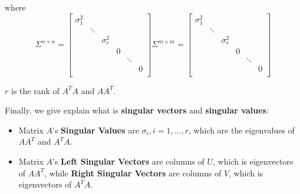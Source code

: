 \documentclass[a4paper]{book}
\newenvironment{proof}[1][Proof]{\begin{trivlist}
\item[\hskip \labelsep {\bfseries #1}]}{\end{trivlist}}
\begin{document}
\begin{proof}
        where
        \begin{displaymath}
          \Sigma^{n \times n}
          = 
          \begin{bmatrix}
            \sigma_{1}^{2}  &         & \\
                            & \ddots  & \\
                            &         & \sigma_{r}^{2} &    \\
                                &         &            & 0  &\\
                                &         &            &    & \ddots  & \\
                                &         &            &    &         &  0 \\
          \end{bmatrix}
          \Sigma^{m \times m}
          = 
          \begin{bmatrix}
            \sigma_{1}^{2}  &         & \\
                            & \ddots  & \\
                            &         & \sigma_{r}^{2} &    \\
                                &         &            & 0  &\\
                                &         &            &    & \ddots  & \\
                                &         &            &    &         &  0 \\
          \end{bmatrix}
        \end{displaymath}

        $r$ is the rank of $A^{T}A$ and $AA^{T}$.
      \end{proof}
Finally, we give explain what is \textbf{singular vectors} and
      \textbf{singular values}:

      \begin{itemize}
        \item Matrix $A$'s \textbf{Singular Values} are $\sigma_{i}, i =
          1, ..., r$, which are the eigenvalues of $AA^{T}$ and
          $A^{T}A$.
        \item Matrix $A$'s \textbf{Left Singular Vectors} are columns of
          $U$, which is eigenvectors of $AA^{T}$, while \textbf{Right
            Singular Vectors} are columns of $V$, which is eigenvectors
          of $A^{T}A$.
      \end{itemize}
\end{document}
